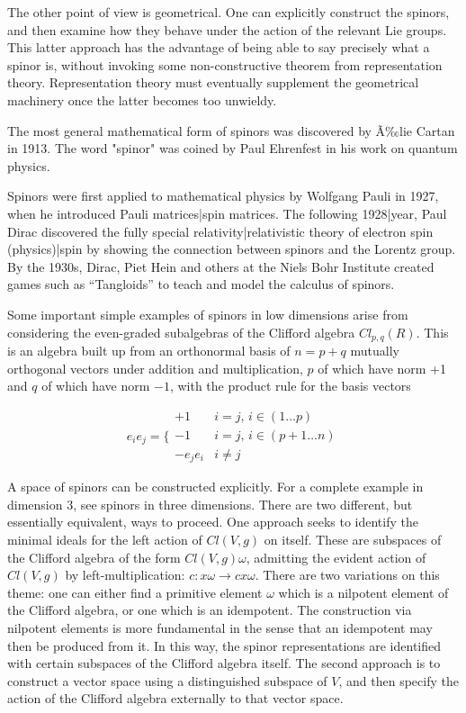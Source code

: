 \documentclass[12pt]{article}
\begin{document}
The other point of view is geometrical. One can explicitly construct the spinors, and then examine how they behave under the action of the relevant Lie groups. This latter approach has the advantage of being able to say precisely what a spinor is, without invoking some non-constructive theorem from representation theory. Representation theory must eventually supplement the geometrical machinery once the latter becomes too unwieldy.

The most general mathematical form of spinors was discovered by Ã‰lie Cartan in 1913. The word "spinor" was coined by Paul Ehrenfest in his work on quantum physics. 

Spinors were first applied to mathematical physics by Wolfgang Pauli in 1927, when he introduced Pauli matrices|spin matrices. The following 1928|year, Paul Dirac discovered the fully special relativity|relativistic theory of electron spin (physics)|spin by showing the connection between spinors and the Lorentz group. By the 1930s, Dirac, Piet Hein  and others at the Niels Bohr Institute created games such as ``Tangloids'' to teach and model the calculus of spinors.

Some important simple examples of spinors in low dimensions arise from considering the even-graded subalgebras of the Clifford algebra $Cl_{p, q}(R)$. This is an algebra built up from an orthonormal basis of $n = p + q$ mutually orthogonal vectors under addition and multiplication, $p$ of which have norm +1 and $q$ of which have norm $-1$, with the product rule for the basis vectors

$$e_i e_j = \Bigg\{ \begin{matrix} +1 & i=j, \, i \in (1 \ldots p) \\
      -1 & i=j, \, i \in (p+1 \ldots n) \\
      - e_j e_i &  i \not = j \end{matrix} $$

A space of spinors can be constructed explicitly. For a complete example in dimension 3, see spinors in three dimensions. There are two different, but essentially equivalent, ways to proceed. One approach seeks to identify the minimal ideals for the left action of $Cl(V, g)$ on itself. These are subspaces of the Clifford algebra of the form $Cl(V, g)\omega$, admitting the evident action of $Cl(V, g)$ by left-multiplication: $c : x\omega \to cx\omega$. There are two variations on this theme: one can either find a primitive element $\omega$ which is a nilpotent element of the Clifford algebra, or one which is an idempotent. The construction via nilpotent elements is more fundamental in the sense that an idempotent may then be produced from it. In this way, the spinor representations are identified with certain subspaces of the Clifford algebra itself. The second approach is to construct a vector space using a distinguished subspace of $V$, and then specify the action of the Clifford algebra externally to that vector space.
\end{document}
